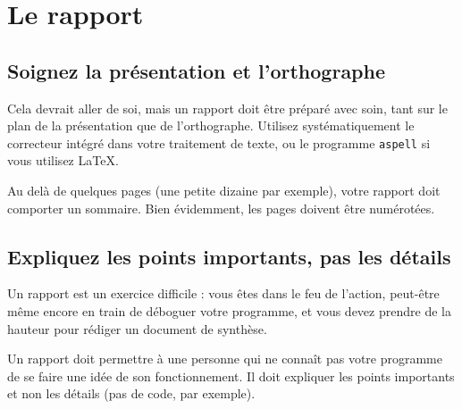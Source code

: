 \documentclass {article}
\begin{document}

\section {Le rapport}

\subsection {Soignez la présentation et l'orthographe}

Cela devrait aller de soi, mais un rapport doit être préparé avec
soin, tant sur le plan de la présentation que de l'orthographe. Utilisez
systématiquement le correcteur intégré dans votre traitement de texte,
ou le programme \texttt {aspell} si vous utilisez \LaTeX.

Au delà de quelques pages (une petite dizaine par exemple), votre
rapport doit comporter un sommaire. Bien évidemment, les pages doivent
être numérotées.


\subsection {Expliquez les points importants, pas les détails}

Un rapport est un exercice difficile : vous êtes dans le feu de l'action,
peut-être même encore en train de déboguer votre programme, et vous
devez prendre de la hauteur pour rédiger un document de synthèse.

Un rapport doit permettre à une personne qui ne connaît pas votre
programme de se faire une idée de son fonctionnement. Il doit expliquer
les points importants et non les détails (pas de code, par exemple).




% 
% 

\end{document}
